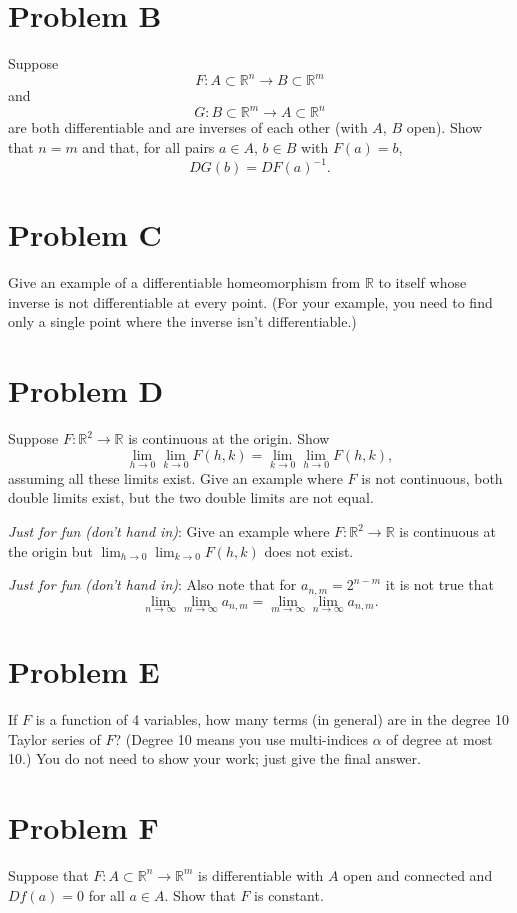 \documentclass[lang=en,11pt]{template}
\begin{document}
\section*{Problem B}
Suppose
\[
F : A \subset \mathbb{R}^n \to B \subset \mathbb{R}^m
\]
and
\[
G : B \subset \mathbb{R}^m \to A \subset \mathbb{R}^n
\]
are both differentiable and are inverses of each other (with $A$, $B$ open). Show that $n = m$ and that, for all pairs $a \in A$, $b \in B$ with $F(a) = b$,
\[
DG(b) = DF(a)^{-1}.
\]

\section*{Problem C}
Give an example of a differentiable homeomorphism from $\mathbb{R}$ to itself whose inverse is not differentiable at every point. (For your example, you need to find only a single point where the inverse isn’t differentiable.)

\section*{Problem D}
Suppose $F : \mathbb{R}^2 \to \mathbb{R}$ is continuous at the origin. Show
\[
\lim_{h \to 0} \lim_{k \to 0} F(h, k) = \lim_{k \to 0} \lim_{h \to 0} F(h, k),
\]
assuming all these limits exist. Give an example where $F$ is not continuous, both double limits exist, but the two double limits are not equal.

\textit{Just for fun (don’t hand in)}: Give an example where $F : \mathbb{R}^2 \to \mathbb{R}$ is continuous at the origin but $\lim_{h \to 0} \lim_{k \to 0} F(h, k)$ does not exist.

\textit{Just for fun (don’t hand in)}: Also note that for $a_{n,m} = 2^{n-m}$ it is not true that
\[
\lim_{n \to \infty} \lim_{m \to \infty} a_{n,m} = \lim_{m \to \infty} \lim_{n \to \infty} a_{n,m}.
\]

\section*{Problem E}
If $F$ is a function of 4 variables, how many terms (in general) are in the degree 10 Taylor series of $F$? (Degree 10 means you use multi-indices $\alpha$ of degree at most 10.) You do not need to show your work; just give the final answer.

\section*{Problem F}
Suppose that $F : A \subset \mathbb{R}^n \to \mathbb{R}^m$ is differentiable with $A$ open and connected and $Df(a) = 0$ for all $a \in A$. Show that $F$ is constant.
\end{document}
